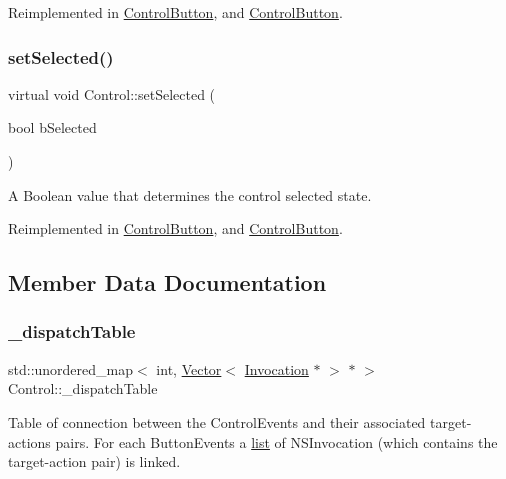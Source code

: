 Reimplemented in \hyperlink{classControlButton_a13c5ecf7e0d2d6ac420dc9d6b6bba24b}{Control\+Button}, and \hyperlink{classControlButton_ae096d582a2e0b072677fa2db84f4ff78}{Control\+Button}.

\mbox{\label{classControl_a05f31c82f5ba3bb758d320f59c404555}} 
\subsubsection{\texorpdfstring{set\+Selected()}{setSelected()}\hspace{0.1cm}{\footnotesize\ttfamily [2/2]}}
{\footnotesize\ttfamily virtual void Control\+::set\+Selected (\begin{DoxyParamCaption}\item[{bool}]{b\+Selected }\end{DoxyParamCaption})\hspace{0.3cm}{\ttfamily [virtual]}}

A Boolean value that determines the control selected state. 

Reimplemented in \hyperlink{classControlButton_a13c5ecf7e0d2d6ac420dc9d6b6bba24b}{Control\+Button}, and \hyperlink{classControlButton_ae096d582a2e0b072677fa2db84f4ff78}{Control\+Button}.



\subsection{Member Data Documentation}
\mbox{\label{classControl_ae60bdd523e1a0ffd80cc2be6d73adc74}} 
\subsubsection{\texorpdfstring{\+\_\+dispatch\+Table}{\_dispatchTable}}
{\footnotesize\ttfamily std\+::unordered\+\_\+map$<$ int, \hyperlink{classVector}{Vector}$<$ \hyperlink{classInvocation}{Invocation} $\ast$ $>$ $\ast$ $>$ Control\+::\+\_\+dispatch\+Table\hspace{0.3cm}{\ttfamily [protected]}}

Table of connection between the Control\+Events and their associated target-\/actions pairs. For each Button\+Events a \hyperlink{protocollist-p}{list} of N\+S\+Invocation (which contains the target-\/action pair) is linked. \mbox{\label{classControl_a220d7ad63279b15d0eed92eec97d8020}} 
